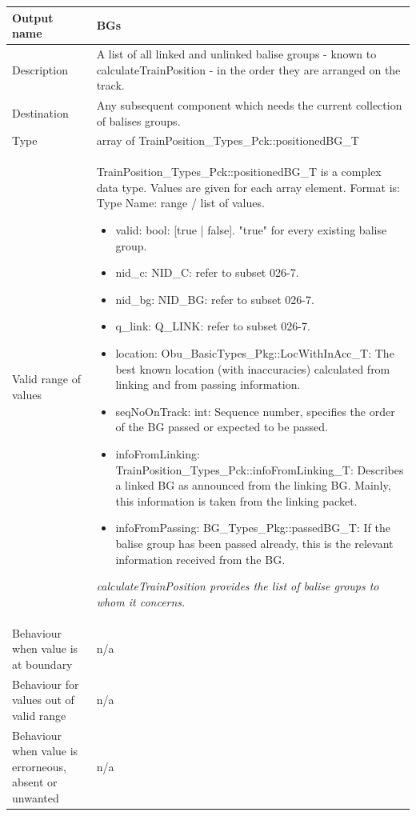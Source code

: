 \begin{longtable}{p{}p{}}
\toprule
Output name				& BGs \\
\midrule
Description				& A list of all linked and unlinked balise groups - known to calculateTrainPosition - in the order they are arranged on the track.   \\
\midrule
Destination				& Any subsequent component which needs the current collection of balises groups. \\ 
\midrule
Type					& array of TrainPosition\_Types\_Pck::positionedBG\_T \\  
\midrule
Valid range of values	& TrainPosition\_Types\_Pck::positionedBG\_T is a complex data type. Values are given for each array element. Format is: Type Name: range / list of values.
\begin{itemize}
	\item valid: bool: [true | false]. "true" for every existing balise group.
	\item nid\_c: NID\_C: refer to subset 026-7. 
	\item nid\_bg: NID\_BG: refer to subset 026-7. 
	\item q\_link: Q\_LINK: refer to subset 026-7. 
	\item location: Obu\_BasicTypes\_Pkg::LocWithInAcc\_T: The best known location (with inaccuracies) calculated from linking and from passing information.
	\item seqNoOnTrack: int: Sequence number, specifies the order of the BG passed or expected to be passed.
	\item infoFromLinking: TrainPosition\_Types\_Pck::infoFromLinking\_T: Describes a linked BG as announced from the linking BG. Mainly, this information is taken from the linking packet.
	\item infoFromPassing: BG\_Types\_Pkg::passedBG\_T: If the balise group has been passed already, this is the relevant information received from the BG.
\end{itemize} 
\emph{calculateTrainPosition provides the list of balise groups to whom it concerns.}\\
\midrule
Behaviour when value is at boundary		& n/a \\
\midrule
Behaviour for values out of valid range	& n/a \\
\midrule
Behaviour when value is errorneous, absent or unwanted & n/a \\
\bottomrule
\end{longtable}


